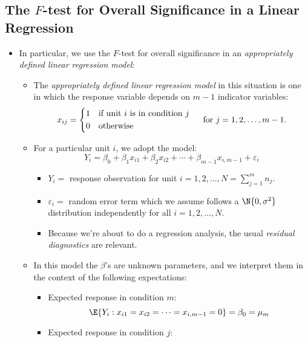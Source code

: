 \subsection{The \texorpdfstring{$ F $}{F}-test for Overall Significance in a Linear Regression}
\begin{itemize}
    \item In particular, we use the $ F $-test for overall significance in an
          \emph{appropriately defined linear regression model}:
          \begin{itemize}
              \item The \emph{appropriately defined linear regression model}
                    in this situation is one in which the response
                    variable depends on $ m-1 $ indicator variables:
                    \[ x_{ij}=\begin{cases*}
                            1 & if unit $ i $ is in condition $ j $ \\
                            0 & otherwise
                        \end{cases*}\quad\text{for }j=1,2,\ldots,m-1. \]
              \item For a particular unit $ i $, we adopt the model:
                    \[ Y_{i}=\beta_0+\beta_1x_{i1}+\beta_2x_{i2}+\cdots+\beta_{m-1}x_{i,m-1}+\varepsilon_i \]
                    \begin{itemize}
                        \item $ Y_i = $ response observation for unit $ i=1,2,\ldots,N=\sum_{j=1}^{m} n_j $.
                        \item $ \varepsilon_i = $ random error term which we assume follows a $ \N{0,\sigma^2} $ distribution
                              independently for all $ i=1,2,\ldots,N $.
                        \item Because we're about to do a regression analysis, the usual \emph{residual diagnostics} are relevant.
                    \end{itemize}
              \item In this model the $ \beta $'s are unknown parameters,
                    and we interpret them in the context of the
                    following expectations:
                    \begin{itemize}
                        \item Expected response in condition $ m $:
                              \[ \E{Y_i\given x_{i1}=x_{i2}=\cdots=x_{i,m-1}=0}=\beta_0=\mu_m \]
                        \item Expected response in condition $ j $:

\end{itemize}
\end{itemize}
\end{itemize}
